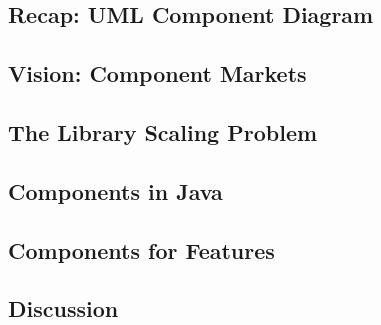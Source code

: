 \subsection{Recap: UML Component Diagram}
\subsection{Vision: Component Markets}
\subsection{The Library Scaling Problem}
\subsection{Components in Java}
\subsection{Components for Features}
\subsection{Discussion}

